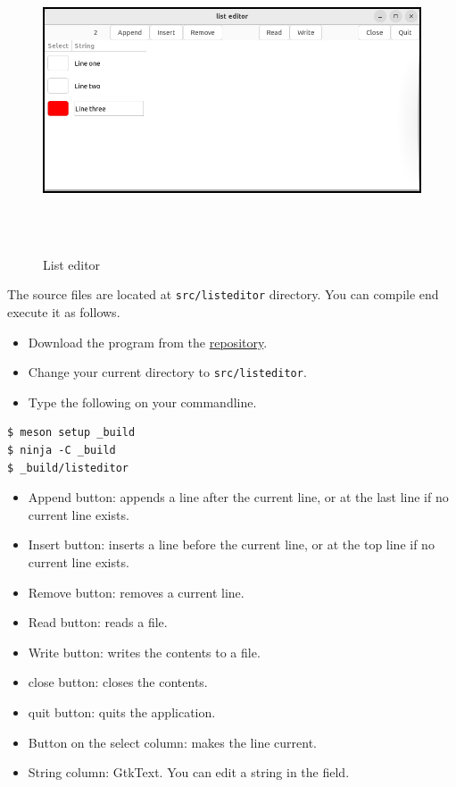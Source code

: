 \begin{figure}
\centering
\includegraphics[width=12cm,height=9cm]{../image/listeditor.png}
\caption{List editor}
\end{figure}

The source files are located at \passthrough{\lstinline!src/listeditor!}
directory. You can compile end execute it as follows.

\begin{itemize}
\tightlist
\item
  Download the program from the
  \href{https://github.com/ToshioCP/Gtk4-tutorial}{repository}.
\item
  Change your current directory to
  \passthrough{\lstinline!src/listeditor!}.
\item
  Type the following on your commandline.
\end{itemize}

\begin{lstlisting}
$ meson setup _build
$ ninja -C _build
$ _build/listeditor
\end{lstlisting}

\begin{itemize}
\tightlist
\item
  Append button: appends a line after the current line, or at the last
  line if no current line exists.
\item
  Insert button: inserts a line before the current line, or at the top
  line if no current line exists.
\item
  Remove button: removes a current line.
\item
  Read button: reads a file.
\item
  Write button: writes the contents to a file.
\item
  close button: closes the contents.
\item
  quit button: quits the application.
\item
  Button on the select column: makes the line current.
\item
  String column: GtkText. You can edit a string in the field.
\end{itemize}

